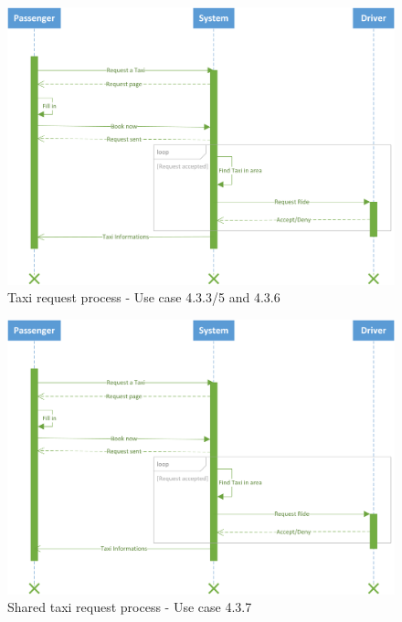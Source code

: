 \documentclass{article}
\begin{document}
        \begin{figure}[h!]
        \centering
        \includegraphics[width=1\columnwidth]{sequenceDiagram/sequence-request}
        \caption{Taxi request process - Use case 4.3.3/5 and 4.3.6}
        \label{fig:seq-req}
    \end{figure}

\newpage 

        \begin{figure}[h!]
        \centering
        \includegraphics[width=1\columnwidth]{sequenceDiagram/shared-request}
        \caption{Shared taxi request process - Use case 4.3.7}
        \label{fig:seq-shreq}
    \end{figure}
    
\end{document}
